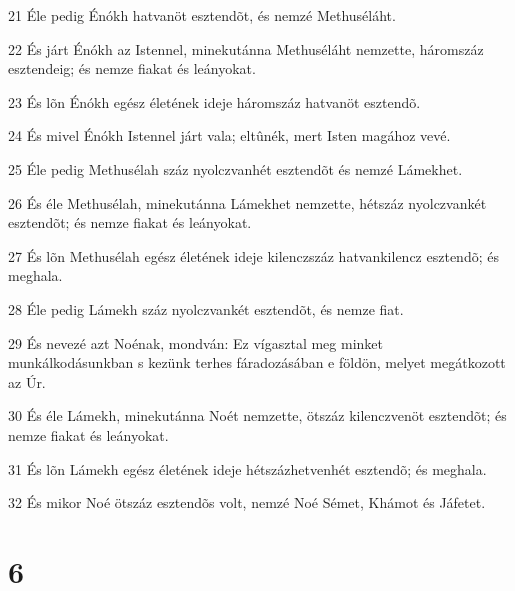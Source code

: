 \par 21 Éle pedig Énókh hatvanöt esztendõt, és nemzé Methuséláht.
\par 22 És járt Énókh az Istennel, minekutánna Methuséláht nemzette, háromszáz esztendeig; és nemze fiakat és leányokat.
\par 23 És lõn Énókh egész életének ideje háromszáz hatvanöt esztendõ.
\par 24 És mivel Énókh Istennel járt vala; eltûnék, mert Isten magához vevé.
\par 25 Éle pedig Methusélah száz nyolczvanhét esztendõt és nemzé Lámekhet.
\par 26 És éle Methusélah, minekutánna Lámekhet nemzette, hétszáz nyolczvankét esztendõt; és nemze fiakat és leányokat.
\par 27 És lõn Methusélah egész életének ideje kilenczszáz hatvankilencz esztendõ; és meghala.
\par 28 Éle pedig Lámekh száz nyolczvankét esztendõt, és nemze fiat.
\par 29 És nevezé azt Noénak, mondván: Ez vígasztal meg minket munkálkodásunkban s kezünk terhes fáradozásában e földön, melyet megátkozott az Úr.
\par 30 És éle Lámekh, minekutánna Noét nemzette, ötszáz kilenczvenöt esztendõt; és nemze fiakat és leányokat.
\par 31 És lõn Lámekh egész életének ideje hétszázhetvenhét esztendõ; és meghala.
\par 32 És mikor Noé ötszáz esztendõs volt, nemzé Noé Sémet, Khámot és Jáfetet.

\chapter{6}

